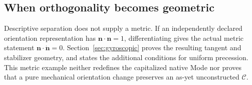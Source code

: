 \subsection*{When orthogonality becomes geometric}
Descriptive separation does not supply a metric. If an independently declared orientation representation has $\mathbf n\cdot\mathbf n=1$, differentiating gives the actual metric statement $\mathbf n\cdot\dot{\mathbf n}=0$. Section~\ref{sec:gyroscopic} proves the resulting tangent and stabilizer geometry, and states the additional conditions for uniform precession. This metric example neither redefines the capitalized native Mode nor proves that a pure mechanical orientation change preserves an as-yet unconstructed $\mathcal C$.
\endgroup
\setcounter{section}{13}
